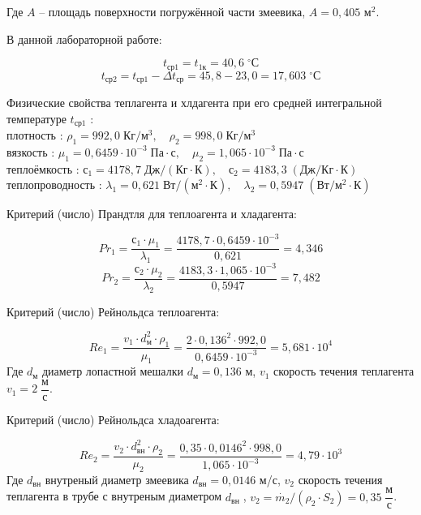 \documentclass[12pt, a4paper]{article}
\begin{document}
Где $A$ -- площадь поверхности погружённой части змеевика, $A = 0,405$ м$^2$.


\begin{flushleft}
В данной лабораторной работе:
\end{flushleft}
$$t_{\textrm{ср1}} = t_{\textrm{1к}} = 40,6 \; ^\circ \textrm{С}$$
$$t_{\textrm{ср2}} = t_{\textrm{ср1}} - \Delta t_{\textrm{ср}} = 45,8 - 23,0 = 17,603 \; ^\circ \textrm{С}$$

\begin{flushleft}
Физические свойства теплагента и хлдагента при его средней интегральной
температуре $t_{\textrm{ср1}}$ : \\

плотность : $\rho_{1} = 992,0 \; \textrm{Кг}/{\textrm{м}^{3}}, \quad \rho_{2} = 998,0 \; \textrm{Кг}/{\textrm{м}^{3}}$\\
вязкость : $\mu_{1} = 0,6459 \cdot 10^{-3} \; \textrm{Па} \cdot \textrm{с}, \quad \mu_{2} = 1,065 \cdot 10^{-3} \; \textrm{Па} \cdot \textrm{с}$\\
теплоёмкость : $\textrm{с}_1 = 4178,7 \; \textrm{Дж} / \left(\textrm{Кг} \cdot \textrm{К}\right), \quad \textrm{с}_2 = 4183,3 \; \left(\textrm{Дж} / \textrm{Кг} \cdot \textrm{К}\right)$\\
теплопроводность : $ \lambda_1 = 0,621 \; \textrm{Вт} / \left(\textrm{м}^2 \cdot \textrm{К}\right), \quad \lambda_2 = 0,5947 \; \left(\textrm{Вт} / \textrm{м}^2 \cdot \textrm{К}\right)$
\end{flushleft}

\begin{flushleft}
Критерий (число) Прандтля для теплоагента и хладагента: 
\end{flushleft}
$$ Pr_1 = \frac{\textrm{с}_1 \cdot \mu_1}{\lambda_1} = \frac{4178,7 \cdot 0,6459 \cdot 10^{-3}}{0,621} = 4,346$$
$$ Pr_2 = \frac{\textrm{с}_2 \cdot \mu_2}{\lambda_2} = \frac{4183,3 \cdot 1,065 \cdot 10^{-3}}{0,5947} = 7,482$$

\begin{flushleft}
Критерий (число) Рейнольдса теплоагента:
\end{flushleft}
$$Re_1 = \frac{v_1 \cdot {d_{\textrm{м}}^2 \cdot \rho_1}}{\mu_1} = \frac{2 \cdot 0,136^2 \cdot 992,0}{0,6459 \cdot 10^{-3}} = 5,681 \cdot 10^4$$
Где $d_{\textrm{м}}$ диаметр лопастной мешалки  $d_{\textrm{м}} = 0,136$ м, $v_1$ скорость течения теплагента $v_1 = 2 \; \dfrac{\textrm{м}}{\textrm{с}}$.

\begin{flushleft}
Критерий (число) Рейнольдса хладоагента:
\end{flushleft}
$$Re_2 = \frac{v_2 \cdot {d_{\textrm{вн}}^2 \cdot \rho_2}}{\mu_2} = \frac{0,35 \cdot 0,0146^2 \cdot 998,0}{1,065 \cdot 10^{-3}} = 4,79 \cdot 10^3$$
Где $d_{\textrm{вн}}$ внутреный диаметр змеевика $d_{\textrm{вн}} = 0,0146$ м/с, $v_2$ скорость течения теплагента в трубе с внутреным диаметром $d_{\textrm{вн}}\;$, $v_2 = \dot{m_2}/\left(\rho_2 \cdot S_2\right) = 0,35\; \dfrac{\textrm{м}}{\textrm{с}}$.
\end{document}
